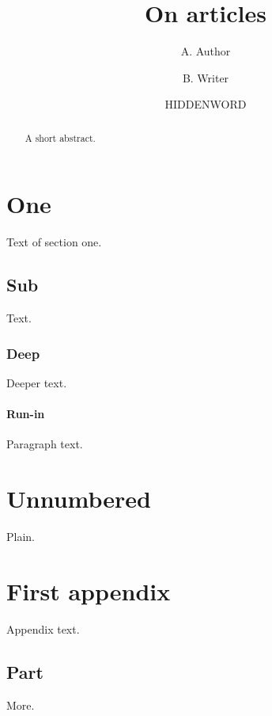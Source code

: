 \documentclass[11pt]{article}
\title{On articles}
\author{A. Author \and B. Writer}
\date{HIDDENWORD}
\begin{document}
\maketitle
\begin{abstract}
A short abstract.
\end{abstract}
\section{One}
Text of section one.
\subsection{Sub}
Text.
\subsubsection{Deep}
Deeper text.
\paragraph{Run-in} Paragraph text.
\section*{Unnumbered}
Plain.
\appendix
\section{First appendix}
Appendix text.
\subsection{Part}
More.
\end{document}
